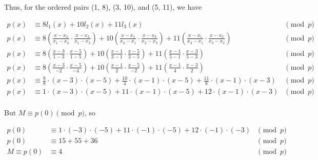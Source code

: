 \documentclass[12pt]{article}
\begin{document}
    Thus, for the ordered pairs (1, 8), (3, 10), and (5, 11), we have

    \begin{align*}
        p(x) &\equiv 8l_1(x) + 10l_2(x) + 11l_3(x) &\pmod{p}\\
        p(x) &\equiv 8\left(\frac{x - x_2}{x_1 - x_2} \cdot \frac{x - x_3}{x_1 - x_3}\right) + 10\left(\frac{x - x_1}{x_2 - x_1} \cdot \frac{x - x_3}{x_2 - x_3}\right) + 11\left(\frac{x - x_1}{x_3 - x_1} \cdot \frac{x - x_2}{x_3 - x_2}\right) &\pmod{p}\\
        p(x) &\equiv 8\left(\frac{x - 3}{1 - 3} \cdot \frac{x - 5}{1 - 5}\right) + 10\left(\frac{x - 1}{3 - 1} \cdot \frac{x - 5}{3 - 5}\right) + 11\left(\frac{x - 1}{5 - 1} \cdot \frac{x - 3}{5 - 3}\right) &\pmod{p}\\
        p(x) &\equiv 8\left(\frac{x - 3}{-2} \cdot \frac{x - 5}{-4}\right) + 10\left(\frac{x - 1}{2} \cdot \frac{x - 5}{-2}\right) + 11\left(\frac{x - 1}{4} \cdot \frac{x - 3}{2}\right) &\pmod{p}\\
        p(x) &\equiv \frac{8}{8} \cdot (x - 3) \cdot (x - 5) + \frac{10}{4} \cdot (x - 1) \cdot (x - 5) + \frac{11}{8} \cdot (x - 1) \cdot (x - 3) &\pmod{p}\\
        p(x) &\equiv 1 \cdot (x - 3) \cdot (x - 5) + 11 \cdot (x - 1) \cdot (x - 5) + 12 \cdot (x - 1) \cdot (x - 3) &\pmod{p}\\
    \end{align*}

    But $M \equiv p(0) \pmod{p}$, so

    \begin{align*}
        p(0) &\equiv 1 \cdot (-3) \cdot (-5) + 11 \cdot (-1) \cdot (-5) + 12 \cdot (-1) \cdot (-3) &\pmod{p}\\
        p(0) &\equiv 15 + 55 + 36 &\pmod{p}\\
        M \equiv p(0) &\equiv 4 &\pmod{p}\\
    \end{align*}
\end{document}
